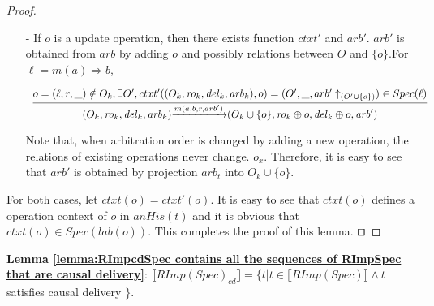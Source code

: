 \begin {proof}
\begin{itemize}
\item[-] If $o$ is a update operation, then there exists function $ctxt'$ and $\mathit{arb}'$. $\mathit{arb}'$ is obtained from $arb$ by adding $o$ and possibly relations between $O$ and $\{ o \}$.For $\ell = m(a) \Rightarrow b$,

     $\begin{array}{l c} \bigfrac{o = (\ell,r,\_) \notin O_k, \exists O', ctxt'((O_k,\mathit{ro}_k,\mathit{del}_k,\mathit{arb}_k),o) = (O',\_,arb' \uparrow_{(O' \cup \{ o \})}) \in Spec(\ell)} {(O_k,\mathit{ro}_k,\mathit{del}_k,\mathit{arb}_k) {\xrightarrow{m(a,b,r,arb')}} (O_k \cup \{ o \},\mathit{ro}_k \oplus o ,\mathit{del}_k \oplus o,\mathit{arb}')}  \end{array}$

     Note that, when arbitration order is changed by adding a new operation, the relations of existing operations never change. $o_x$. Therefore, it is easy to see that $\mathit{arb}'$ is obtained by projection $arb_t$ into $O_k \cup \{ o \}$.
\end{itemize}

For both cases, let $ctxt(o) = ctxt'(o)$. It is easy to see that $ctxt(o)$ defines a operation context of $o$ in $anHis(t)$ and it is obvious that $ctxt(o) \in Spec(lab(o))$. This completes the proof of this lemma. $\qed$
\end {proof}






{\noindent \bf Lemma \ref{lemma:RImpcdSpec contains all the sequences of RImpSpec that are causal delivery}}: $\llbracket RImp(Spec)_{\mathit{cd}} \rrbracket = \{ t \vert t \in \llbracket RImp(Spec) \rrbracket \wedge t$ satisfies causal delivery $\}$.

